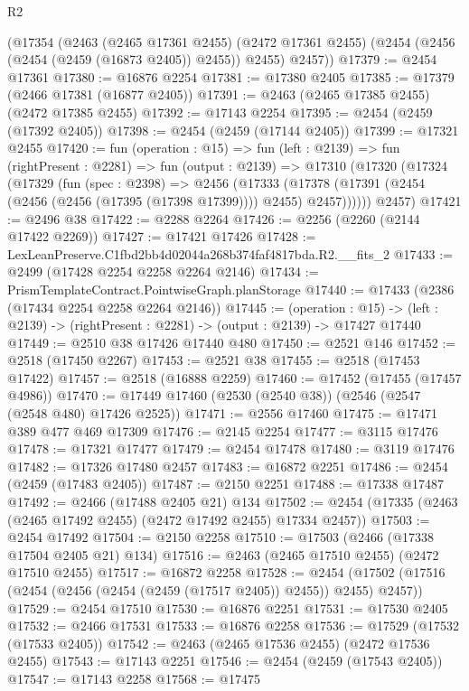 \begin{lexlean}{R2}
\begin{coremodule}
    (@17354
      (@2463
        (@2465 @17361 @2455)
        (@2472 @17361 @2455)
        (@2454 (@2456 (@2454 (@2459 (@16873 @2405)) @2455)) @2455)
        @2457))
@17379 := @2454 @17361
@17380 := @16876 @2254
@17381 := @17380 @2405
@17385 := @17379 (@2466 @17381 (@16877 @2405))
@17391 := @2463 (@2465 @17385 @2455) (@2472 @17385 @2455)
@17392 := @17143 @2254
@17395 := @2454 (@2459 (@17392 @2405))
@17398 := @2454 (@2459 (@17144 @2405))
@17399 := @17321 @2455
@17420 := fun (operation : @15) =>
  fun (left : @2139) =>
  fun (rightPresent : @2281) =>
  fun (output : @2139) =>
  @17310
    (@17320
      (@17324
        (@17329
          (fun (spec : @2398) =>
          @2456
            (@17333
              (@17378 (@17391 (@2454 (@2456 (@2456 (@17395 (@17398 @17399)))) @2455) @2457))))))
      @2457)
@17421 := @2496 @38
@17422 := @2288 @2264
@17426 := @2256 (@2260 (@2144 @17422 @2269))
@17427 := @17421 @17426
@17428 := LexLeanPreserve.C1fbd2bb4d02044a268b374faf4817bda.R2.__fits_2
@17433 := @2499 (@17428 @2254 @2258 @2264 @2146)
@17434 := PrismTemplateContract.PointwiseGraph.planStorage
@17440 := @17433 (@2386 (@17434 @2254 @2258 @2264 @2146))
@17445 := (operation : @15) ->
  (left : @2139) -> (rightPresent : @2281) -> (output : @2139) -> @17427 @17440
@17449 := @2510 @38 @17426 @17440 @480
@17450 := @2521 @146
@17452 := @2518 (@17450 @2267)
@17453 := @2521 @38
@17455 := @2518 (@17453 @17422)
@17457 := @2518 (@16888 @2259)
@17460 := @17452 (@17455 (@17457 @4986))
@17470 := @17449 @17460 (@2530 (@2540 @38)) (@2546 (@2547 (@2548 @480) @17426 @2525))
@17471 := @2556 @17460
@17475 := @17471 @389 @477 @469 @17309
@17476 := @2145 @2254
@17477 := @3115 @17476
@17478 := @17321 @17477
@17479 := @2454 @17478
@17480 := @3119 @17476
@17482 := @17326 @17480 @2457
@17483 := @16872 @2251
@17486 := @2454 (@2459 (@17483 @2405))
@17487 := @2150 @2251
@17488 := @17338 @17487
@17492 := @2466 (@17488 @2405 @21) @134
@17502 := @2454 (@17335 (@2463 (@2465 @17492 @2455) (@2472 @17492 @2455) @17334 @2457))
@17503 := @2454 @17492
@17504 := @2150 @2258
@17510 := @17503 (@2466 (@17338 @17504 @2405 @21) @134)
@17516 := @2463 (@2465 @17510 @2455) (@2472 @17510 @2455)
@17517 := @16872 @2258
@17528 := @2454 (@17502 (@17516 (@2454 (@2456 (@2454 (@2459 (@17517 @2405)) @2455)) @2455) @2457))
@17529 := @2454 @17510
@17530 := @16876 @2251
@17531 := @17530 @2405
@17532 := @2466 @17531
@17533 := @16876 @2258
@17536 := @17529 (@17532 (@17533 @2405))
@17542 := @2463 (@2465 @17536 @2455) (@2472 @17536 @2455)
@17543 := @17143 @2251
@17546 := @2454 (@2459 (@17543 @2405))
@17547 := @17143 @2258
@17568 := @17475

\end{coremodule}
\end{lexlean}
